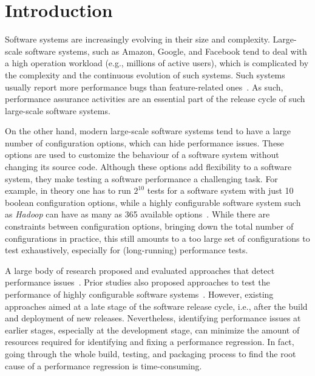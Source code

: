 
\section{Introduction}
\label{sec:intro}
Software systems are increasingly evolving in their size and complexity.
Large-scale software systems, such as Amazon, Google, and Facebook tend to deal with a high operation workload (e.g., millions of active users), which is complicated by the complexity and the continuous evolution of such systems. Such systems usually report more performance bugs than feature-related ones~\cite{weyuker2000experience}. As such, performance assurance activities are an essential part of the release cycle of such large-scale software systems.

On the other hand, modern large-scale software systems tend to have a large number of configuration options, which can hide performance issues. %
These options are used to customize the behaviour of a software system without changing its source code. Although these options add flexibility to a software system, they make testing a software performance a challenging task. For example, in theory one has to run $2^
{10}$ tests for a software system with just 10 boolean configuration options, while a highly configurable software system such as \emph{Hadoop} can have as many as 365 available options~\cite{tse}. While there are constraints between configuration options, bringing down the total number of configurations in practice, this still amounts to a too large set of configurations to test exhaustively, especially for (long-running) performance tests.
 
A large body of research proposed and evaluated approaches that detect performance issues~\cite{Nguyen:2012:ADP,nguyen2011automated,Nguyen:2014:ICS,foo2010mining,DBLP:conf/icse/FooJAHZF15}. Prior studies also proposed approaches to test the performance of highly configurable software systems~\cite{DBLP:journals/dt/SaxenaFHMYM00,wu2010performance,DBLP:journals/ese/HalinNADPB19}. However, existing approaches aimed at a late stage of the software release cycle, i.e., after the build and deployment of new releases. Nevertheless, identifying performance issues at earlier stages, especially at the development stage, can minimize the amount of resources required for identifying and fixing a performance regression. In fact, going through the whole build, testing, and packaging process to find the root cause of a performance regression is time-consuming. 


